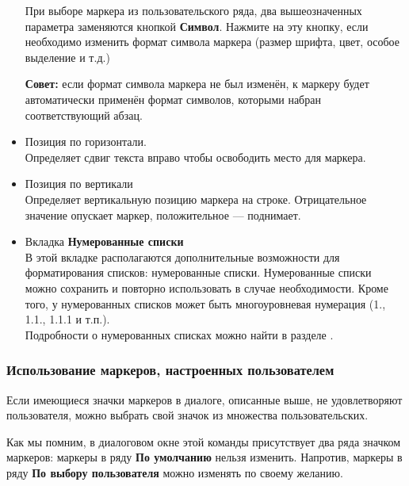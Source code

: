﻿\documentclass[a4paper,10pt]{article}
\begin{document}
\begin{itemize}
При выборе маркера из пользовательского ряда, два вышеозначенных параметра заменяются кнопкой \textbf{Символ}. Нажмите на эту кнопку, если необходимо изменить формат символа маркера (размер шрифта, цвет, особое выделение и т.д.)
\begin{mdframed}[backgroundcolor=blue!10]
\textbf{Совет:} если формат символа маркера не был изменён, к маркеру будет автоматически применён формат символов, которыми набран соответствующий абзац.
\end{mdframed}
\item Позиция по горизонтали.\\
Определяет сдвиг текста вправо чтобы освободить место для маркера.
\item Позиция по вертикали\\
Определяет вертикальную позицию маркера на строке. Отрицательное значение опускает маркер, положительное — поднимает.
\item Вкладка \textbf{Нумерованные списки}\\
В этой вкладке располагаются дополнительные возможности для форматирования списков: нумерованные списки. Нумерованные списки можно сохранить и повторно использовать в случае необходимости. Кроме того, у нумерованных списков может быть многоуровневая нумерация (1., 1.1., 1.1.1 и т.п.).\\
Подробности о нумерованных списках можно найти в разделе .
\end{itemize}

\subsubsection{Использование маркеров, настроенных пользователем}
Если имеющиеся значки маркеров в диалоге, описанные выше, не удовлетворяют пользователя, можно выбрать свой значок из множества пользовательских.

Как мы помним, в диалоговом окне этой команды присутствует два ряда значком маркеров: маркеры в ряду \textbf{По умолчанию} нельзя изменить. Напротив, маркеры в ряду \textbf{По выбору пользователя} можно изменять по своему желанию.
\end{document}
